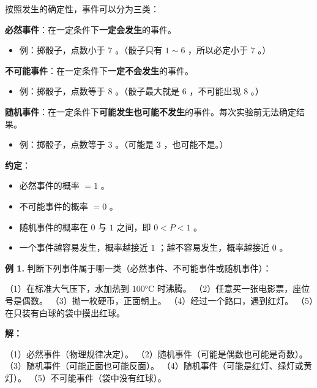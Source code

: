 \begin{understand}


按照发生的确定性，事件可以分为三类：

\textbf{必然事件}：在一定条件下\textbf{一定会发生}的事件。
\begin{itemize}
  \item 例：掷骰子，点数小于 $7$ 。（骰子只有 $1 \sim 6$ ，所以必定小于 $7$ 。）
\end{itemize}


\textbf{不可能事件}：在一定条件下\textbf{一定不会发生}的事件。
\begin{itemize}
  \item 例：掷骰子，点数等于 $8$ 。（骰子最大就是 $6$ ，不可能出现 $8$ 。）
\end{itemize}


\textbf{随机事件}：在一定条件下\textbf{可能发生也可能不发生}的事件。每次实验前无法确定结果。
\begin{itemize}
  \item 例：掷骰子，点数等于 $3$ 。（可能是 $3$ ，也可能不是。）
\end{itemize}


\textbf{约定}：
\begin{itemize}
  \item 必然事件的概率 $= 1$ 。
  \item 不可能事件的概率 $= 0$ 。
  \item 随机事件的概率在 $0$ 与 $1$ 之间，即 $0 < P < 1$ 。
  \item 一个事件越容易发生，概率越接近 $1$ ；越不容易发生，概率越接近 $0$ 。
\end{itemize}


\end{understand}

\begin{workedexamples}


\textbf{例 1.} 判断下列事件属于哪一类（必然事件、不可能事件或随机事件）：

（1）在标准大气压下，水加热到 $100°\text{C}$ 时沸腾。
（2）任意买一张电影票，座位号是偶数。
（3）抛一枚硬币，正面朝上。
（4）经过一个路口，遇到红灯。
（5）在只装有白球的袋中摸出红球。

\textbf{解：}

（1）必然事件（物理规律决定）。
（2）随机事件（可能是偶数也可能是奇数）。
（3）随机事件（可能正面也可能反面）。
（4）随机事件（可能是红灯、绿灯或黄灯）。
（5）不可能事件（袋中没有红球）。

\end{workedexamples}

